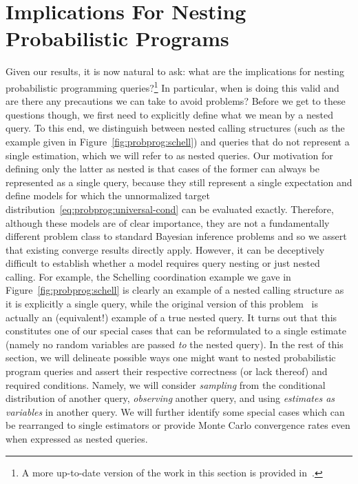 
\section{Implications For Nesting Probabilistic Programs}
\label{sec:nest:imp}

Given our results, it is now natural to ask: what are the implications for nesting probabilistic programming queries?\footnote{A more
	up-to-date version of the work in this section
	is provided in~\citep{rainforth2017nestpp}.}
In particular, when is doing
this valid and are there any precautions we can take to avoid problems?  Before
we get to these questions though, we first need to explicitly define what we
mean by a nested query.  To this end, we distinguish between nested calling
structures (such as the example given in Figure~\ref{fig:probprog:schell}) and
queries that do not represent a single estimation, which we will refer
to as nested queries. Our motivation for defining only the latter
as nested is that cases of the former can always be represented as a single
query, because they still represent a single expectation and define models
for which the unnormalized target distribution~\eqref{eq:probprog:universal-cond}
 can be evaluated exactly.  Therefore, although these models are
of clear importance, they are not a fundamentally different problem class
to standard Bayesian inference problems and so we assert that existing \mc
converge results directly apply.  However, it can be deceptively difficult to establish
whether a model requires query nesting or just nested calling.
For example, the Schelling coordination example we gave in Figure~\ref{fig:probprog:schell}
is clearly an example of a nested calling structure as it is explicitly a single query,
while the original version of this problem~\cite[Figure 6]{stuhlmuller2014reasoning}
is actually an (equivalent!) example of a true nested query.  It turns out that this
constitutes one of our special cases that can be reformulated to a single estimate (namely
no random variables are passed \emph{to} the nested query).
In the rest of this section, we will delineate possible ways one might want
to nested probabilistic program queries and
assert their respective correctness (or lack thereof) and required conditions.
Namely, we will consider \emph{sampling} from the conditional distribution
of another query, \emph{observing} another query, and using \emph{estimates as variables}
in another query.  We will further identify some special cases which can be rearranged to single estimators or
provide Monte Carlo convergence rates even when expressed as nested queries.

